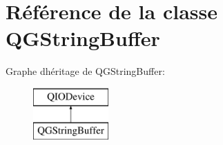 \hypertarget{class_q_g_string_buffer}{}\section{Référence de la classe Q\+G\+String\+Buffer}
\label{class_q_g_string_buffer}
Graphe d\textquotesingle{}héritage de Q\+G\+String\+Buffer\+:\begin{figure}[H]
\begin{center}
\leavevmode
\includegraphics[height=2.000000cm]{class_q_g_string_buffer}
\end{center}
\end{figure}

